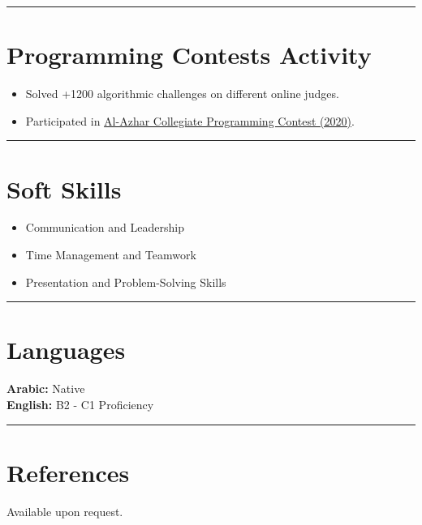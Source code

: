 \documentclass[a4paper,10pt]{article}
\begin{document}
\noindent\rule{\linewidth}{0.3mm} %

\section*{Programming Contests Activity}
\begin{itemize}[leftmargin=*]
    \item Solved +1200 algorithmic challenges on different online judges.
    \item Participated in \href{https://drive.google.com/file/d/1L2w-xp9LEYIkzK9PAs0-Fbm2yFh7iffF/view}{Al-Azhar Collegiate Programming Contest (2020)}.
\end{itemize}

\noindent\rule{\linewidth}{0.3mm} %

\section*{Soft Skills}
\begin{itemize}[leftmargin=*]
    \item Communication and Leadership
    \item Time Management and Teamwork
    \item Presentation and Problem-Solving Skills
\end{itemize}

\noindent\rule{\linewidth}{0.3mm} %

\section*{Languages}
\noindent
\textbf{Arabic:} Native \\
\textbf{English:} B2 - C1 Proficiency

\noindent\rule{\linewidth}{0.3mm} %

\section*{References}
Available upon request.
\end{document}
